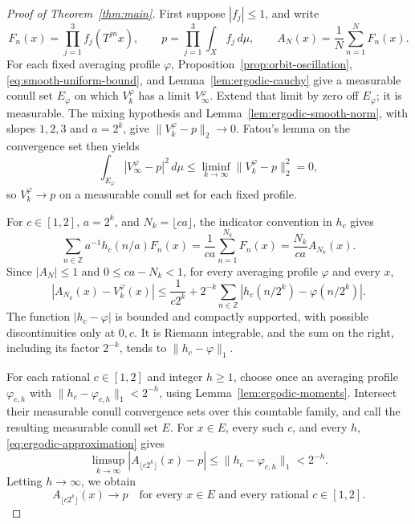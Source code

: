 \begin{proof}[Proof of Theorem~\ref{thm:main}]
First suppose \(|f_j|\leq1\), and write
\[
 F_n(x)=\prod_{j=1}^3 f_j(T^{jn}x),\qquad
 p=\prod_{j=1}^3\int_Xf_j\,d\mu,\qquad
 A_N(x)=\frac1N\sum_{n=1}^NF_n(x).
\]
For each fixed averaging profile \(\varphi\),
Proposition~\ref{prop:orbit-oscillation},
\eqref{eq:smooth-uniform-bound}, and Lemma~\ref{lem:ergodic-cauchy}
give a measurable conull set \(E_\varphi\) on which \(V_k^\varphi\) has a
limit \(V_\infty^\varphi\).  Extend that limit by zero off \(E_\varphi\);
it is measurable.  The mixing hypothesis and
Lemma~\ref{lem:ergodic-smooth-norm}, with slopes \(1,2,3\) and \(a=2^k\),
give \(\|V_k^\varphi-p\|_2\to0\).  Fatou's lemma on the convergence set
then yields
\[
 \int_{E_\varphi}|V_\infty^\varphi-p|^2\,d\mu
 \leq\liminf_{k\to\infty}\|V_k^\varphi-p\|_2^2=0,
\]
so \(V_k^\varphi\to p\) on a measurable conull set for each fixed profile.

For \(c\in[1,2]\), \(a=2^k\), and \(N_k=\lfloor ca\rfloor\), the
indicator convention in \(h_c\) gives
\[
 \sum_{n\in\mathbb Z}a^{-1}h_c(n/a)F_n(x)
   =\frac1{ca}\sum_{n=1}^{N_k}F_n(x)
   =\frac{N_k}{ca}A_{N_k}(x).
\]
Since \(|A_N|\leq1\) and \(0\leq ca-N_k<1\), for every averaging
profile \(\varphi\) and every \(x\),
\begin{equation}
 |A_{N_k}(x)-V_k^\varphi(x)|
 \leq\frac1{c2^k}
       +2^{-k}\sum_{n\in\mathbb Z}
          |h_c(n/2^k)-\varphi(n/2^k)|.
 \label{eq:ergodic-approximation}
\end{equation}
The function \(|h_c-\varphi|\) is bounded and compactly supported, with
possible discontinuities only at \(0,c\).  It is Riemann integrable, and
the sum on the right, including its factor \(2^{-k}\), tends to
\(\|h_c-\varphi\|_1\).

For each rational \(c\in[1,2]\) and integer \(h\geq1\), choose once an
averaging profile \(\varphi_{c,h}\) with
\(\|h_c-\varphi_{c,h}\|_1<2^{-h}\), using
Lemma~\ref{lem:ergodic-moments}.  Intersect their measurable conull
convergence sets over this countable family, and call the resulting
measurable conull set \(E\).  For \(x\in E\), every such \(c\), and
every \(h\), \eqref{eq:ergodic-approximation} gives
\[
 \limsup_{k\to\infty}|A_{\lfloor c2^k\rfloor}(x)-p|
 \leq\|h_c-\varphi_{c,h}\|_1<2^{-h}.
\]
Letting \(h\to\infty\), we obtain
\begin{equation}
 A_{\lfloor c2^k\rfloor}(x)\longrightarrow p
 \quad\text{for every }x\in E
       \text{ and every rational }c\in[1,2].
 \label{eq:ergodic-rational-lengths}
\end{equation}


\end{proof}
